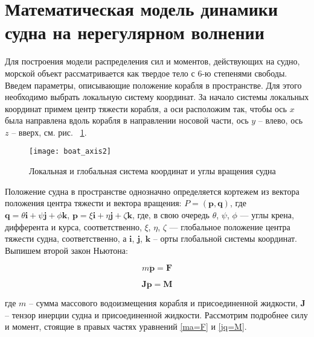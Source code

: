 \section{Математическая модель динамики судна на нерегулярном волнении}
\label{math_ship}

Для построения модели распределения сил и моментов, действующих на судно, морской объект рассматривается как твердое тело с 6-ю степенями свободы. Введем параметры, описывающие положение корабля в пространстве. Для этого необходимо выбрать локальную систему координат. За начало системы локальных координат примем центр тяжести корабля, а оси расположим так, чтобы ось $x$ была направлена вдоль корабля в направлении носовой части, ось $y$ – влево, ось $z$ – вверх, см. рис. ~\ref{boat_axis}.

\begin{figure}[ht]
\begin{center}
\texttt{[image: boat\_axis2]}
\end{center}
\caption{Локальная и глобальная система координат и углы вращения судна}
\label{boat_axis}
\end{figure}

Положение судна в пространстве однозначно определяется кортежем из вектора положения центра тяжести и вектора вращения: 
$P=(\mathbf{p},\mathbf{q})$, 
где  
$\mathbf{q}=\theta \mathbf{i}+\psi \mathbf{j}+\phi \mathbf{k}$, 
$\mathbf{p}=\xi \mathbf{i}+\eta \mathbf{j}+\zeta \mathbf{k}$, 
где, в свою очередь $\theta$, $\psi$, $\phi$ --- углы крена, дифферента и курса, соответственно, 
 $\xi$, $\eta$, $\zeta$ --- глобальное положение центра тяжести судна, соответственно, 
а $\mathbf{i}$, $\mathbf{j}$, $\mathbf{k}$ – орты глобальной системы координат. Выпишем второй закон Ньютона:

\begin{equation}
	m \ddot{\mathbf{p}} = \mathbf{F}
	\label{ma=F}
\end{equation}

\begin{equation}
	\mathbf{J}  \ddot{\mathbf{p}} = \mathbf{M}
	\label{jq=M}
\end{equation}

где $m$ – сумма массового водоизмещения корабля и присоединенной жидкости, $\mathbf{J}$ – тензор инерции судна и присоединенной жидкости. Рассмотрим подробнее силу и момент, стоящие в правых частях уравнений \eqref{ma=F} и \eqref{jq=M}. 

